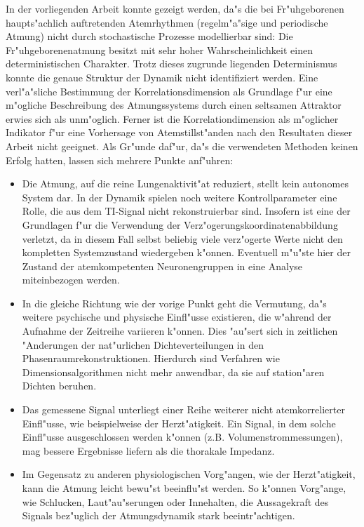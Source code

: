 
In der vorliegenden Arbeit konnte gezeigt werden, da"s die bei Fr"uhgeborenen
haupt\-s"ach\-lich auftretenden Atemrhythmen (regelm"a"sige und periodische Atmung)  nicht durch stochastische Prozesse modellierbar
sind: Die Fr"uhgeborenenatmung besitzt mit sehr hoher Wahrscheinlichkeit einen
deterministischen Charakter. Trotz dieses zugrunde liegenden Determinismus konnte die
genaue Struktur der Dynamik nicht identifiziert werden. Eine verl"a"sliche Bestimmung der
Korrelationsdimension als Grundlage f"ur eine m"ogliche Beschreibung des Atmungssystems
durch einen seltsamen Attraktor erwies sich als  unm"oglich. Ferner ist die Korrelationdimension
als m"oglicher Indikator f"ur eine Vorhersage von Atemstillst"anden nach den Resultaten dieser Arbeit 
nicht geeignet. Als Gr"unde daf"ur, da"s  die verwendeten Methoden keinen Erfolg hatten, lassen sich mehrere
Punkte anf"uhren:

\begin{itemize}
\item Die Atmung, auf die reine Lungenaktivit"at reduziert, stellt kein autonomes System
  dar. In der Dynamik spielen noch weitere Kontrollparameter eine Rolle, die aus dem TI-Signal
  nicht rekonstruierbar sind. Insofern ist eine der Grundlagen f"ur die Verwendung der
  Verz"ogerungskoordinatenabbildung verletzt, da in diesem Fall selbst beliebig viele verz"ogerte
  Werte nicht den kompletten Systemzustand wiedergeben k"onnen.  Eventuell m"u"ste hier
  der Zustand der atemkompetenten Neuronengruppen in eine Analyse miteinbezogen werden.
  
\item In die gleiche Richtung wie der vorige Punkt geht die Vermutung, da"s
  weitere psychische und physische Einfl"usse existieren, die w"ahrend der Aufnahme der Zeitreihe variieren k"onnen.
  Dies "au"sert sich in zeitlichen "Anderungen der nat"urlichen Dichteverteilungen in den
  Phasenraumrekonstruktionen. Hierdurch sind Verfahren wie Dimensionsalgorithmen nicht
  mehr anwendbar, da sie auf station"aren Dichten beruhen.
  
\item Das gemessene Signal unterliegt einer Reihe weiterer nicht atemkorrelierter
  Einfl"usse, wie beispielweise der Herzt"atigkeit. Ein Signal, in dem solche Einfl"usse
  ausgeschlossen werden k"onnen (z.B. Volumenstrommessungen), mag bessere Ergebnisse
  liefern als die thorakale Impedanz.
  
\item Im Gegensatz zu anderen physiologischen Vorg"angen, wie der Herzt"atigkeit, kann die
  Atmung leicht bewu"st beeinflu"st werden. So k"onnen Vorg"ange, wie Schlucken,
  Laut"au"serungen oder Innehalten, die Aussagekraft des Signals bez"uglich der
  Atmungsdynamik stark beeintr"achtigen.
\end{itemize}

